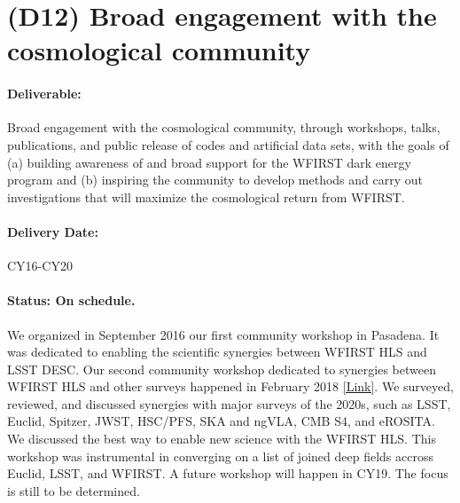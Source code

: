 \section*{(D12) Broad engagement with the cosmological community}

\paragraph*{Deliverable:} Broad engagement with the cosmological community, through
workshops, talks, publications, and public release of codes and artificial data
sets, with the goals of (a) building awareness of and broad support for the
WFIRST dark energy program and (b) inspiring the community to develop methods
and carry out investigations that will maximize the cosmological return from
WFIRST.

\paragraph*{Delivery Date:} CY16-CY20

\paragraph*{Status: On schedule.} We organized in September 2016 our first community workshop in Pasadena. It was dedicated to enabling the scientific synergies between WFIRST HLS and LSST DESC. Our second community workshop dedicated to synergies between WFIRST HLS and other surveys happened in February 2018 \href{http://www.wfirst-hls-cosmology.org/workshops/}{[Link]}. We surveyed, reviewed, and discussed synergies with major surveys of the 2020s, such as LSST, Euclid, Spitzer, JWST, HSC/PFS, SKA and ngVLA, CMB S4, and eROSITA. We discussed the best way to enable new science with the WFIRST HLS. This workshop was instrumental in converging on a list of joined deep fields accross Euclid, LSST, and WFIRST. A future workshop will happen in CY19. The focus is still to be determined.

